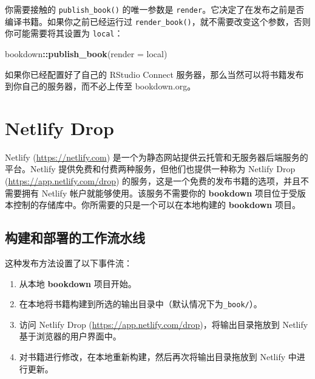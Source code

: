\documentclass[
  12pt,
]{krantz}
\newenvironment{Shaded}{\begin{snugshade}}{\end{snugshade}}
\newcommand{\AttributeTok}[1]{\textcolor[rgb]{0.13,0.29,0.53}{#1}}
\newcommand{\FunctionTok}[1]{\textcolor[rgb]{0.13,0.29,0.53}{\textbf{#1}}}
\newcommand{\NormalTok}[1]{#1}
\newcommand{\SpecialCharTok}[1]{\textcolor[rgb]{0.81,0.36,0.00}{\textbf{#1}}}
\newcommand{\StringTok}[1]{\textcolor[rgb]{0.31,0.60,0.02}{#1}}
\providecommand{\tightlist}{%
  \setlength{\itemsep}{0pt}\setlength{\parskip}{0pt}}
\theoremstyle{definition}
\theoremstyle{definition}
\theoremstyle{definition}
\theoremstyle{definition}
\theoremstyle{remark}
\begin{document}
你需要接触的 \texttt{publish\_book()} 的唯一参数是 \texttt{render}。它决定了在发布之前是否编译书籍。如果你之前已经运行过 \texttt{render\_book()}，就不需要改变这个参数，否则你可能需要将其设置为 \texttt{\textquotesingle{}local\textquotesingle{}}：

\begin{Shaded}
\begin{Highlighting}[]
\NormalTok{bookdown}\SpecialCharTok{::}\FunctionTok{publish\_book}\NormalTok{(}\AttributeTok{render =} \StringTok{\textquotesingle{}local\textquotesingle{}}\NormalTok{)}
\end{Highlighting}
\end{Shaded}

如果你已经配置好了自己的 RStudio Connect 服务器，那么当然可以将书籍发布到你自己的服务器，而不必上传至 bookdown.org。

\section{Netlify Drop}\label{netlify-drop}

Netlify (\url{https://netlify.com}) 是一个为静态网站提供云托管和无服务器后端服务的平台。Netlify 提供免费和付费两种服务，但他们也提供一种称为 Netlify Drop (\url{https://app.netlify.com/drop}) 的服务，这是一个免费的发布书籍的选项，并且不需要拥有 Netlify 帐户就能够使用。该服务不需要你的 \textbf{bookdown} 项目位于受版本控制的存储库中。你所需要的只是一个可以在本地构建的 \textbf{bookdown} 项目。

\subsection{构建和部署的工作流水线}\label{ux6784ux5efaux548cux90e8ux7f72ux7684ux5de5ux4f5cux6d41ux6c34ux7ebf}

这种发布方法设置了以下事件流：

\begin{enumerate}
\def\labelenumi{\arabic{enumi}.}
\tightlist
\item
  从本地 \textbf{bookdown} 项目开始。
\item
  在本地将书籍构建到所选的输出目录中（默认情况下为\texttt{\_book/}）。
\item
  访问 Netlify Drop (\url{https://app.netlify.com/drop})，将输出目录拖放到 Netlify 基于浏览器的用户界面中。
\item
  对书籍进行修改，在本地重新构建，然后再次将输出目录拖放到 Netlify 中进行更新。
\end{enumerate}
\end{document}

